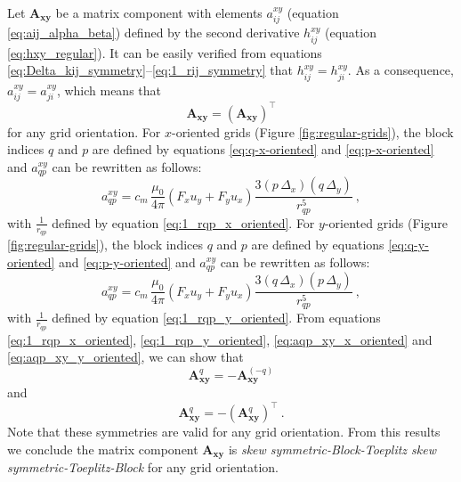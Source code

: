 \documentclass[manuscript]{geophysics}
\providecommand{\DIFaddtex}[1]{{\protect\color{blue}\uwave{#1}}} %
\providecommand{\DIFaddbegin}{} %
\providecommand{\DIFaddend}{} %
\providecommand{\DIFadd}[1]{\texorpdfstring{\DIFaddtex{#1}}{#1}} %
\begin{document}
	Let $\mathbf{A}_{\boldsymbol{xy}}$ be a matrix component with elements
	$a^{xy}_{ij}$ (equation \ref{eq:aij_alpha_beta}) defined by the second derivative \DIFaddbegin \DIFadd{calculated in
	}\DIFaddend $h^{xy}_{ij}$ (equation \ref{eq:hxy_regular}). It can be easily verified from equations
	\ref{eq:Delta_kij_symmetry}--\ref{eq:1_rij_symmetry} that $h^{xy}_{ij} = h^{xy}_{ji}$.
	As a consequence, $a^{xy}_{ij} = a^{xy}_{ji}$, which means that 
	\begin{equation}
		\mathbf{A}_{\boldsymbol{xy}} = \left( \mathbf{A}_{\boldsymbol{xy}} \right)^{\top}
		\label{eq:Axy_symmetry}
	\end{equation}
	for any grid orientation.
	For $x$-oriented grids (Figure \ref{fig:regular-grids}), the block indices $q$ and $p$ are defined 
	by equations \ref{eq:q-x-oriented} and 
	\ref{eq:p-x-oriented} and $a^{xy}_{qp}$ can be rewritten as follows:
	\begin{equation}
		a^{xy}_{qp} = c_{m} \, \frac{\mu_{0}}{4\pi} 
		\left( F_{x} u_{y} + F_{y} u_{x} \right) \frac{3 \left( p \, \Delta_{x} \right)\left( q \, \Delta_{y} \right)}{r_{qp}^{5}}
		\: ,
		\label{eq:aqp_xy_x_oriented}
	\end{equation}
	with $\tfrac{1}{r_{qp}}$ defined by equation \ref{eq:1_rqp_x_oriented}.
	For $y$-oriented grids (Figure \ref{fig:regular-grids}), the block indices $q$ and $p$ are 
	defined by equations \ref{eq:q-y-oriented} and 
	\ref{eq:p-y-oriented} and $a^{xy}_{qp}$ can be rewritten as follows:
	\begin{equation}
		a^{xy}_{qp} = c_{m} \, \frac{\mu_{0}}{4\pi} 
		\left( F_{x} u_{y} + F_{y} u_{x} \right) \frac{3 \left( q \, \Delta_{x} \right)\left( p \, \Delta_{y} \right)}{r_{qp}^{5}} \: ,
		\label{eq:aqp_xy_y_oriented}
	\end{equation}
	with $\tfrac{1}{r_{qp}}$ defined by equation \ref{eq:1_rqp_y_oriented}.
	From equations \ref{eq:1_rqp_x_oriented}, \ref{eq:1_rqp_y_oriented}, \ref{eq:aqp_xy_x_oriented} 
	and \ref{eq:aqp_xy_y_oriented}, we can show that
	\begin{equation}
		\mathbf{A}_{\boldsymbol{xy}}^{q} = -\mathbf{A}_{\boldsymbol{xy}}^{(-q)}
		\label{eq:Axy_q_external_block_symmetry}
	\end{equation}
	and 
	\begin{equation}
		\mathbf{A}_{\boldsymbol{xy}}^{q} = -\left( \mathbf{A}_{\boldsymbol{xy}}^{q} \right)^{\top} \: .
		\label{eq:Axy_q_internal_block_symmetry}
	\end{equation}
	Note that these symmetries are valid for any grid orientation.
	From this results we conclude the matrix component 
	$\mathbf{A}_{\boldsymbol{xy}}$ is \textit{skew symmetric-Block-Toeplitz skew symmetric-Toeplitz-Block} 
	for any grid orientation.
	
\end{document}
